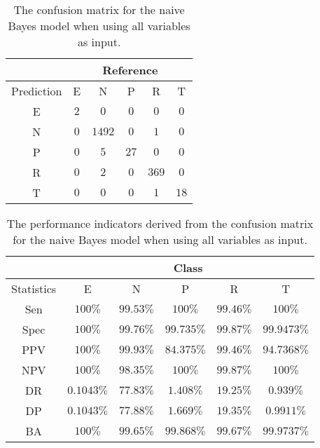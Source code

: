 \begin{table}[!ht]
	\centering
	\begin{tabular}{|c|c|c|c|c|c|}
		\hline
		 & \multicolumn{5}{|c|}{Reference} \\ \hline
		 Prediction & E & N & P & R & T \\ \hline
		 E & $2$ & $0$ & $0$ & $0$ & $0$ \\ \hline
		 N & $0$ & $1492$ & $0$ & $1$ & $0$ \\ \hline
		 P & $0$ & $5$ & $27$ & $0$ & $0$ \\ \hline
		 R & $0$ & $2$ & $0$ & $369$ & $0$ \\ \hline
		 T & $0$ & $0$ & $0$ & $1$ & $18$ \\ \hline
	\end{tabular}
	\caption{The confusion matrix for the naive Bayes model when using all variables as input.}
	\label{tab:cm:all:nb}
\end{table}

\begin{table}[!ht]
	\centering
	\begin{tabular}{|c|c|c|c|c|c|}
		\hline
		 & \multicolumn{5}{c|}{Class} \\ \hline
		Statistics & E & N & P & R & T \\ \hline
		Sen & $100\%$ & $99.53\%$ & $100\%$ & $99.46\%$ & $100\%$ \\ \hline
		Spec & $100\%$ & $99.76\%$ & $99.735\%$ & $99.87\%$ & $99.9473\%$ \\ \hline
		PPV & $100\%$ & $99.93\%$ & $84.375\%$ & $99.46\%$ & $94.7368\%$ \\ \hline
		NPV & $100\%$ & $98.35\%$ & $100\%$ & $99.87\%$ & $100\%$ \\ \hline
		DR & $0.1043\%$ & $77.83\%$ & $1.408\%$ & $19.25\%$ & $0.939\%$ \\ \hline
		DP & $0.1043\%$ & $77.88\%$ & $1.669\%$ & $19.35\%$ & $0.9911\%$ \\ \hline
		BA & $100\%$ & $99.65\%$ & $99.868\%$ & $99.67\%$ & $99.9737\%$ \\ \hline
	\end{tabular}
	\caption{The performance indicators derived from the confusion matrix for the naive Bayes model when using all variables as input.}
	\label{tab:cs:reverse:all:nb}
\end{table}

